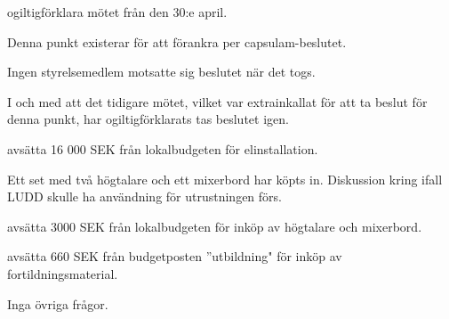 \documentclass{protokoll}
\begin{document}
\begin{beslut}
  \att ogiltigförklara mötet från den 30:e april.
\end{beslut}
Denna punkt existerar för att förankra per capsulam-beslutet. 

Ingen styrelsemedlem motsatte sig beslutet när det togs.

I och med att det tidigare mötet, vilket var extrainkallat för att ta beslut
för denna punkt, har ogiltigförklarats tas beslutet igen. 
\begin{beslut}
  \att avsätta 16 000 SEK från lokalbudgeten för elinstallation.
\end{beslut}

Ett set med två högtalare och ett mixerbord har köpts in.  
Diskussion kring ifall LUDD skulle ha användning för utrustningen förs. 
\begin{beslut}
  \att avsätta 3000 SEK från lokalbudgeten för inköp av högtalare och
  mixerbord. 
\end{beslut}


\begin{beslut}
  \att avsätta 660 SEK från budgetposten ''utbildning" för inköp av
  fortildningsmaterial.
\end{beslut}

Inga övriga frågor.
\end{document}
